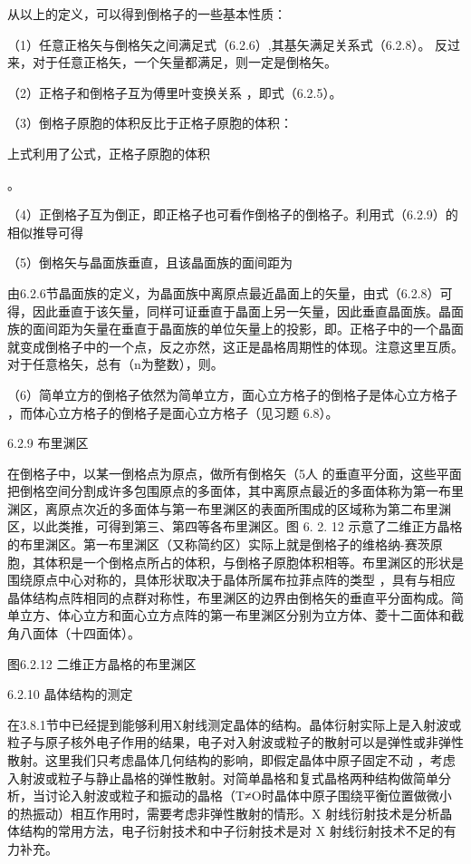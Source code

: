 从以上的定义，可以得到倒格子的一些基本性质：

（1）任意正格矢与倒格矢之间满足式（6.2.6）,其基矢满足关系式（6.2.8）。 反过来，对于任意正格矢，一个矢量都满足，则一定是倒格矢。

（2）正格子和倒格子互为傅里叶变换关系 ，即式（6.2.5）。

（3）倒格子原胞的体积反比于正格子原胞的体积：



上式利用了公式，正格子原胞的体积

。

（4）正倒格子互为倒正，即正格子也可看作倒格子的倒格子。利用式（6.2.9）的相似推导可得







（5）倒格矢与晶面族垂直，且该晶面族的面间距为



由6.2.6节晶面族的定义，为晶面族中离原点最近晶面上的矢量，由式（6.2.8）可得，因此垂直于该矢量，同样可证垂直于晶面上另一矢量，因此垂直晶面族。晶面族的面间距为矢量在垂直于晶面族的单位矢量上的投影，即。正格子中的一个晶面就变成倒格子中的一个点，反之亦然，这正是晶格周期性的体现。注意这里互质。对于任意格矢，总有（n为整数），则。

（6）简单立方的倒格子依然为简单立方，面心立方格子的倒格子是体心立方格子 ，而体心立方格子的倒格子是面心立方格子（见习题 6.8）。



6.2.9 布里渊区

在倒格子中，以某一倒格点为原点，做所有倒格矢（5人 的垂直平分面，这些平面把倒格空间分割成许多包围原点的多面体，其中离原点最近的多面体称为第一布里渊区，离原点次近的多面体与第一布里渊区的表面所围成的区域称为第二布里渊区，以此类推，可得到第三、第四等各布里渊区。图 6. 2. 12 示意了二维正方晶格的布里渊区。第一布里渊区（又称简约区）实际上就是倒格子的维格纳-赛茨原胞，其体积是一个倒格点所占的体积，与倒格子原胞体积相等。布里渊区的形状是围绕原点中心对称的，具体形状取决于晶体所属布拉菲点阵的类型 ，具有与相应晶体结构点阵相同的点群对称性，布里渊区的边界由倒格矢的垂直平分面构成。简单立方、体心立方和面心立方点阵的第一布里渊区分别为立方体、菱十二面体和截角八面体（十四面体）。



图6.2.12 二维正方晶格的布里渊区

6.2.10 晶体结构的测定

在3.8.1节中已经提到能够利用X射线测定晶体的结构。晶体衍射实际上是入射波或粒子与原子核外电子作用的结果，电子对入射波或粒子的散射可以是弹性或非弹性散射。这里我们只考虑晶体几何结构的影响，即假定晶体中原子固定不动 ，考虑入射波或粒子与静止晶格的弹性散射。对简单晶格和复式晶格两种结构做简单分析，当讨论入射波或粒子和振动的晶格（T≠O时晶体中原子围绕平衡位置做微小的热振动）相互作用时，需要考虑非弹性散射的情形。X 射线衍射技术是分析晶体结构的常用方法，电子衍射技术和中子衍射技术是对 X 射线衍射技术不足的有力补充。

